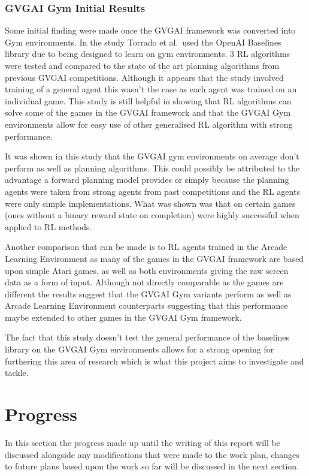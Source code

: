 \documentclass[a4paper]{article}
\begin{document}
\subsubsection{GVGAI Gym Initial Results}
Some initial finding were made once the GVGAI framework was converted into Gym environments.
In the study Torrado et al.\ used the OpenAI Baselines\cite{baselines} library due to being designed to learn on gym environments.
3 RL algorithms were tested and compared to the state of the art planning algorithms from previous GVGAI competitions\cite{GVGAIGYM}.
Although it appears that the study involved training of a general agent this wasn't the case as each agent was trained on an individual game.
This study is still helpful in showing that RL algorithms can solve some of the games in the GVGAI framework and that the GVGAI Gym environments allow for easy use of other generalised RL algorithm with strong performance.
\par
It was shown in this study that the GVGAI gym environments on average don't perform as well as planning algorithms.
This could possibly be attributed to the advantage a forward planning model provides or simply because the planning agents were taken from strong agents from past competitions and the RL agents were only simple implementations.
What was shown was that on certain games (ones without a binary reward state on completion) were highly successful when applied to RL methods.
\par
Another comparison that can be made is to RL agents trained in the Arcade Learning Environment as many of the games in the GVGAI framework are based upon simple Atari games, as well as both environments giving the raw screen data as a form of input\cite{ALE}.
Although not directly comparable as the games are different the results suggest that the GVGAI Gym variants perform as well as Arcade Learning Environment counterparts suggesting that this performance maybe extended to other games in the GVGAI Gym framework.
\par
The fact that this study doesn't test the general performance of the baselines library on the GVGAI Gym environments allows for a strong opening for furthering this area of research which is what this project aims to investigate and tackle.

\pagebreak
\section{Progress}
In this section the progress made up until the writing of this report will be discussed alongside any modifications that were made to the work plan, changes to future plans based upon the work so far will be discussed in the next section.
\end{document}
